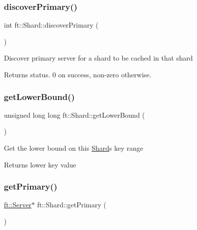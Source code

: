\subsubsection{\texorpdfstring{discover\+Primary()}{discoverPrimary()}}
{\footnotesize\ttfamily int ft\+::\+Shard\+::discover\+Primary (\begin{DoxyParamCaption}{ }\end{DoxyParamCaption})}

Discover primary server for a shard to be cached in that shard

\begin{DoxyReturn}{Returns}
status. 0 on success, non-\/zero otherwise. 
\end{DoxyReturn}
\mbox{\label{classft_1_1Shard_a5c75dfb7d06ed5ff8a1ceeca7b199576}} 
\subsubsection{\texorpdfstring{get\+Lower\+Bound()}{getLowerBound()}}
{\footnotesize\ttfamily unsigned long long ft\+::\+Shard\+::get\+Lower\+Bound (\begin{DoxyParamCaption}{ }\end{DoxyParamCaption})\hspace{0.3cm}{\ttfamily [inline]}}

Get the lower bound on this \mbox{\hyperlink{classft_1_1Shard}{Shard}}\textquotesingle{}s key range

\begin{DoxyReturn}{Returns}
lower key value 
\end{DoxyReturn}
\mbox{\label{classft_1_1Shard_a76b726de0fb962f51f453c68ebe751e3}} 
\subsubsection{\texorpdfstring{get\+Primary()}{getPrimary()}}
{\footnotesize\ttfamily \mbox{\hyperlink{classft_1_1Server}{ft\+::\+Server}}$\ast$ ft\+::\+Shard\+::get\+Primary (\begin{DoxyParamCaption}{ }\end{DoxyParamCaption})\hspace{0.3cm}{\ttfamily [inline]}}

